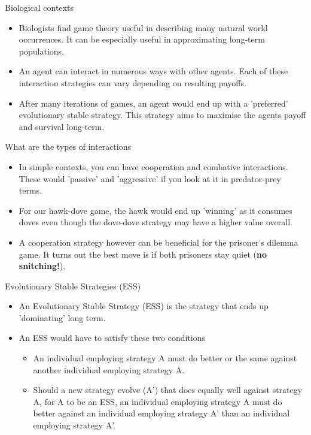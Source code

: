 \documentclass[aspectratio=169, handout]{beamer}
\begin{document}
\begin{frame}{Biological contexts}
    \begin{itemize}
        \item Biologists find game theory useful in describing many natural world occurrences. It can be especially useful in approximating long-term populations.
        \pause
        \item An agent can interact in numerous ways with other agents. Each of these interaction strategies can vary depending on resulting payoffs.
        \pause 
        \item After many iterations of games, an agent would end up with a 'preferred' evolutionary stable strategy. This strategy aims to maximise the agents payoff and survival long-term.
    \end{itemize}
\end{frame}

\begin{frame}{What are the types of interactions}
    \begin{itemize}
        \item In simple contexts, you can have cooperation and combative interactions. These would 'passive' and 'aggressive' if you look at it in predator-prey terms.
        \pause 
        \item For our hawk-dove game, the hawk would end up 'winning' as it consumes doves even though the dove-dove strategy may have a higher value overall.
        \pause
        \item A cooperation strategy however can be beneficial for the prisoner's dilemma game. It turns out the best move is if both prisoners stay quiet (\textbf{no snitching!}).
    \end{itemize}    
\end{frame}

\begin{frame}{Evolutionary Stable Strategies (ESS)}
    \begin{itemize}
        \item An Evolutionary Stable Strategy (ESS) is the strategy that ends up 'dominating' long term.
        \pause
        \item An ESS would have to satisfy these two conditions
        \begin{itemize}
            \item An individual employing strategy A must do better or the same against another individual employing strategy A.
            \item Should a new strategy evolve (A') that does equally well against strategy A, for A to be an ESS, an individual employing strategy A must do better against an individual employing strategy A' than an individual employing strategy A'.
        \end{itemize}
    \end{itemize}  
\end{frame}
\end{document}
